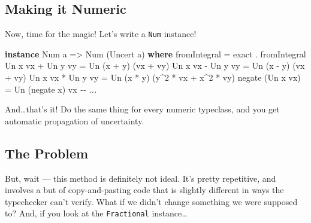 \documentclass[]{article}
\newenvironment{Shaded}{}{}
\newcommand{\CommentTok}[1]{\textcolor[rgb]{0.38,0.63,0.69}{\textit{#1}}}
\newcommand{\DataTypeTok}[1]{\textcolor[rgb]{0.56,0.13,0.00}{#1}}
\newcommand{\DecValTok}[1]{\textcolor[rgb]{0.25,0.63,0.44}{#1}}
\newcommand{\FunctionTok}[1]{\textcolor[rgb]{0.02,0.16,0.49}{#1}}
\newcommand{\KeywordTok}[1]{\textcolor[rgb]{0.00,0.44,0.13}{\textbf{#1}}}
\newcommand{\NormalTok}[1]{#1}
\newcommand{\OperatorTok}[1]{\textcolor[rgb]{0.40,0.40,0.40}{#1}}
\newcommand{\OtherTok}[1]{\textcolor[rgb]{0.00,0.44,0.13}{#1}}
\begin{document}
\subsection{Making it Numeric}\label{making-it-numeric}

Now, time for the magic! Let's write a \texttt{Num} instance!

\begin{Shaded}
\begin{Highlighting}[]
\KeywordTok{instance} \DataTypeTok{Num}\NormalTok{ a }\OtherTok{=\textgreater{}} \DataTypeTok{Num}\NormalTok{ (}\DataTypeTok{Uncert}\NormalTok{ a) }\KeywordTok{where}
    \FunctionTok{fromIntegral}      \OtherTok{=}\NormalTok{ exact }\OperatorTok{.} \FunctionTok{fromIntegral}
    \DataTypeTok{Un}\NormalTok{ x vx }\OperatorTok{+} \DataTypeTok{Un}\NormalTok{ y vy }\OtherTok{=} \DataTypeTok{Un}\NormalTok{ (x }\OperatorTok{+}\NormalTok{ y)    (vx }\OperatorTok{+}\NormalTok{ vy)}
    \DataTypeTok{Un}\NormalTok{ x vx }\OperatorTok{{-}} \DataTypeTok{Un}\NormalTok{ y vy }\OtherTok{=} \DataTypeTok{Un}\NormalTok{ (x }\OperatorTok{{-}}\NormalTok{ y)    (vx }\OperatorTok{+}\NormalTok{ vy)}
    \DataTypeTok{Un}\NormalTok{ x vx }\OperatorTok{*} \DataTypeTok{Un}\NormalTok{ y vy }\OtherTok{=} \DataTypeTok{Un}\NormalTok{ (x }\OperatorTok{*}\NormalTok{ y)    (y}\OperatorTok{\^{}}\DecValTok{2} \OperatorTok{*}\NormalTok{ vx }\OperatorTok{+}\NormalTok{ x}\OperatorTok{\^{}}\DecValTok{2} \OperatorTok{*}\NormalTok{ vy)}
    \FunctionTok{negate}\NormalTok{ (}\DataTypeTok{Un}\NormalTok{ x vx)  }\OtherTok{=} \DataTypeTok{Un}\NormalTok{ (}\FunctionTok{negate}\NormalTok{ x) vx}
    \CommentTok{{-}{-} ...}
\end{Highlighting}
\end{Shaded}

And\ldots that's it! Do the same thing for every numeric typeclass, and you get
automatic propagation of uncertainty.

\subsection{The Problem}\label{the-problem}

But, wait --- this method is definitely not ideal. It's pretty repetitive, and
involves a but of copy-and-pasting code that is slightly different in ways the
typechecker can't verify. What if we didn't change something we were supposed
to? And, if you look at the \texttt{Fractional} instance\ldots{}
\end{document}
